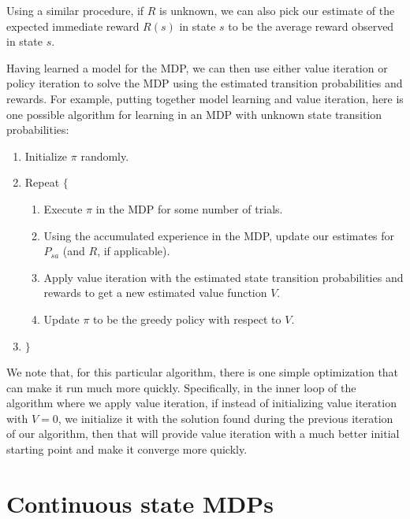 \documentclass{article}
\begin{document}
Using a similar procedure, if $R$ is unknown, we can also pick our
estimate of the expected immediate reward $R(s)$ in state $s$ to be the average
reward observed in state $s$.

Having learned a model for the MDP, we can then use either value iteration or
policy iteration to solve the MDP using the estimated transition probabilities
and rewards.  For example, putting together model learning and value iteration,
here is one possible algorithm for learning in an MDP with unknown state transition
probabilities:

\begin{enumerate}
\item Initialize $\pi$ randomly.
\item Repeat $\{$
\begin{enumerate}
\item Execute $\pi$ in the MDP for some number of trials.
\item Using the accumulated experience in the MDP, update our estimates for $P_{sa}$
(and $R$, if applicable).
\item Apply value iteration with the estimated state transition probabilities and
rewards to get a new estimated value function $V$.
\item Update $\pi$ to be the greedy policy with respect to $V$.
\end{enumerate}
\item[] $\}$
\end{enumerate}

We note that, for this particular algorithm, there is one simple optimization that
can make it run much more quickly.  Specifically, in the inner loop of the
algorithm where we apply value iteration, if instead of initializing value
iteration with $V=0$, we initialize it with the solution found during the
previous iteration of our algorithm, then that will provide value iteration with
a much better initial starting point and make it converge more quickly.

\section{Continuous state MDPs}
\end{document}
